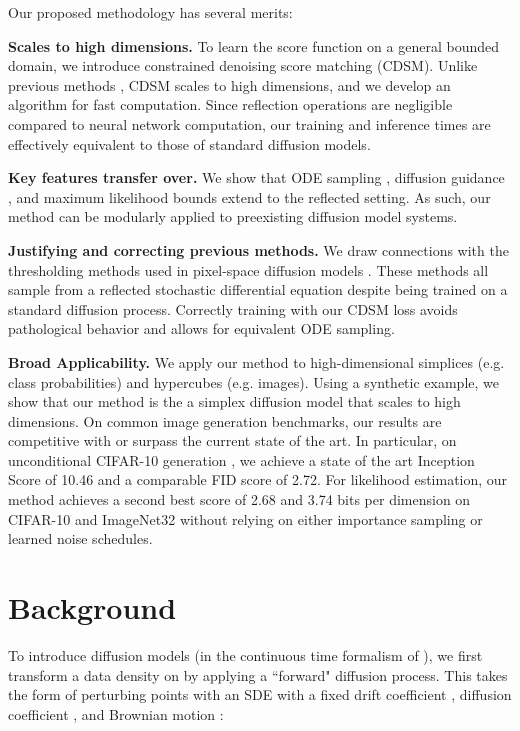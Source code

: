 \documentclass{article}
\theoremstyle{plain}
\theoremstyle{definition}
\theoremstyle{remark}
\begin{document}
Our proposed methodology has several merits:

\textbf{Scales to high dimensions.} To learn the score function on a general bounded domain, we introduce constrained denoising score matching (CDSM). Unlike previous methods \cite{Hyvrinen2007SomeEO}, CDSM scales to high dimensions, and we develop an algorithm for fast computation. Since reflection operations are negligible compared to neural network computation, our training and inference times are effectively equivalent to those of standard diffusion models.

\textbf{Key features transfer over.} We show that ODE sampling \citep{Song2020ScoreBasedGM}, diffusion guidance \citep{Ho2022ClassifierFreeDG}, and maximum likelihood bounds \citep{Song2021MaximumLT} extend to the reflected setting. As such, our method can be modularly applied to preexisting diffusion model systems.

\textbf{Justifying and correcting previous methods.} We draw connections with the thresholding methods used in pixel-space diffusion models \citep{Saharia2022PhotorealisticTD}. These methods all sample from a reflected stochastic differential equation despite being trained on a standard diffusion process. Correctly training with our CDSM loss avoids pathological behavior and allows for equivalent ODE sampling.

\textbf{Broad Applicability.} We apply our method to high-dimensional simplices (e.g. class probabilities) and hypercubes (e.g. images). Using a synthetic example, we show that our method is the a simplex diffusion model that scales to high dimensions. On common image generation benchmarks, our results are competitive with or surpass the current state of the art. In particular, on unconditional CIFAR-10 generation \citep{Krizhevsky2009LearningML}, we achieve a state of the art Inception Score of 10.46 and a comparable FID score of 2.72. For likelihood estimation, our method achieves a second best score of 2.68 and 3.74 bits per dimension on CIFAR-10 and ImageNet32 \citep{Oord2016PixelRN} without relying on either importance sampling or learned noise schedules. \section{Background}

To introduce diffusion models (in the continuous time formalism of \cite{Song2020ScoreBasedGM}), we first transform a data density  on  by applying a ``forward" diffusion process. This takes the form of perturbing points  with an SDE with a fixed drift coefficient , diffusion coefficient , and Brownian motion :
\end{document}
